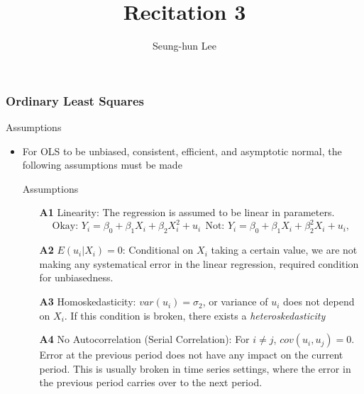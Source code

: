 \documentclass[compress]{beamer}
\title[Recitation 3]{Recitation 3} %
\author[Seung-hun Lee]{Seung-hun Lee}
\institute[Columbia University]{Columbia University}
\date[]{}
\begin{document}
\begin{frame}
\titlepage
\end{frame}






\begin{frame}
\frametitle{Ordinary Least Squares}
Assumptions
\begin{itemize}
\item For OLS to be unbiased, consistent, efficient, and asymptotic normal, the following assumptions must be made
\begin{block}{Assumptions}
\begin{itemize}
\item[\textbf{A1}] Linearity: The regression is assumed to be linear in parameters.
\[
\text{Okay: } Y_i = \beta_0 + \beta_1X_i + \beta_2X_i^2+u_i \ \ \text{Not: } Y_i = \beta_0 + \beta_1X_i + \beta_2^2X_i+u_i,
\]

\item[\textbf{A2}] $E(u_i|X_i)=0$: Conditional on $X_i$ taking a certain value, we are not making any systematical error in the linear regression, required condition for unbiasedness. 
\item[\textbf{A3}] Homoskedasticity: $var(u_i)=\sigma_2$, or variance of $u_i$ does not depend on $X_i$. If this condition is broken, there exists a \textit{heteroskedasticity}
\item[\textbf{A4}] No Autocorrelation (Serial Correlation): For $i\neq j$, $cov(u_i,u_j)=0$. Error at the previous period does not have any impact on the current period. This is usually broken in time series settings, where the error in the previous period carries over to the next period.
\end{itemize}
\end{block}
\end{itemize}
\end{frame}
\end{document}
